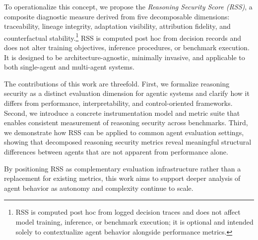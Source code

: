 To operationalize this concept, we propose the \emph{Reasoning Security Score (RSS)}, a composite diagnostic measure derived from five decomposable dimensions: traceability, lineage integrity, adaptation visibility, attribution fidelity, and counterfactual stability.\footnote{RSS is computed post hoc from logged decision traces and does not affect model training, inference, or benchmark execution; it is optional and intended solely to contextualize agent behavior alongside performance metrics.} RSS is computed post hoc from decision records and does not alter training objectives, inference procedures, or benchmark execution. It is designed to be architecture-agnostic, minimally invasive, and applicable to both single-agent and multi-agent systems.

The contributions of this work are threefold. First, we formalize reasoning security as a distinct evaluation dimension for agentic systems and clarify how it differs from performance, interpretability, and control-oriented frameworks. Second, we introduce a concrete instrumentation model and metric suite that enables consistent measurement of reasoning security across benchmarks. Third, we demonstrate how RSS can be applied to common agent evaluation settings, showing that decomposed reasoning security metrics reveal meaningful structural differences between agents that are not apparent from performance alone.

By positioning RSS as complementary evaluation infrastructure rather than a replacement for existing metrics, this work aims to support deeper analysis of agent behavior as autonomy and complexity continue to scale.
